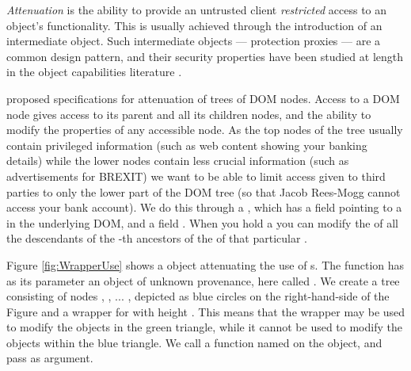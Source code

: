 \emph{Attenuation} is the ability to provide an untrusted client \emph{restricted}  access to an object's functionality. This is usually achieved through the introduction of an intermediate object. Such intermediate objects --- protection proxies \cite{gof} --- are a common design pattern, and their security properties have been studied at length in the object capabilities literature \cite{MillerPhD,murray10-infoflow}.

\citet{dd} proposed specifications for attenuation of trees of DOM  nodes.
Access to a DOM node
gives access to its parent and all its children nodes, and the ability to
modify the properties of any accessible node. As the top nodes of the
tree usually contain privileged information (such as web content
showing your banking details) while the lower nodes contain less
crucial information (such as advertisements for BREXIT) we want to be
able to limit access given to third parties to only the lower part of
the DOM tree (so that Jacob Rees-Mogg cannot access your bank
account). We do this through a , which has
a field  pointing to a  in the underlying DOM, and a field .
When you hold
a  you can modify the  of all the
descendants of the -th ancestors of the  of that
particular . 


Figure \ref{fig:WrapperUse} shows a
 object attenuating the use of 
s.
The
function  has as its parameter an object of unknown
provenance, here called . We create a tree
consisting of nodes , , ... , depicted as blue
circles on the right-hand-side of the Figure and a
wrapper for  with height . This means that the
wrapper  may be used to modify
 the objects in the green triangle, while it cannot be used to
modify the objects within the
blue triangle.  We call a function named  on
the  object, and pass  as argument.

